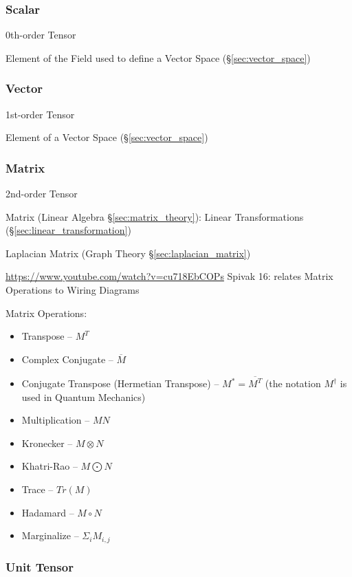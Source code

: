 {{\subsubsection{Scalar}\label{sec:scalar}

0th-order Tensor

Element of the Field used to define a Vector Space
(\S\ref{sec:vector_space})



\subsubsection{Vector}\label{sec:vector}

1st-order Tensor

Element of a Vector Space (\S\ref{sec:vector_space})



\subsubsection{Matrix}\label{sec:matrix}

2nd-order Tensor

Matrix (Linear Algebra \S\ref{sec:matrix_theory}):
Linear Transformations (\S\ref{sec:linear_transformation})

Laplacian Matrix (Graph Theory \S\ref{sec:laplacian_matrix})

\url{https://www.youtube.com/watch?v=cu718EbCOPs} Spivak 16: relates
Matrix Operations to Wiring Diagrams %

Matrix Operations:
\begin{itemize}
\item Transpose -- $M^T$
\item Complex Conjugate -- $\overline{M}$
\item Conjugate Transpose (Hermetian Transpose) -- $M^* = \overline{M^T}$
  (the notation $M^\dag$ is used in Quantum Mechanics)
\item Multiplication -- $MN$
\item Kronecker -- $M \otimes N$
\item Khatri-Rao -- $M \bigodot N$
\item Trace -- $Tr(M)$
\item Hadamard -- $M \circ N$
\item Marginalize -- $\Sigma_i M_{i,j}$
\end{itemize}



\subsubsection{Unit Tensor}\label{sec:unit_tensor}

}}
